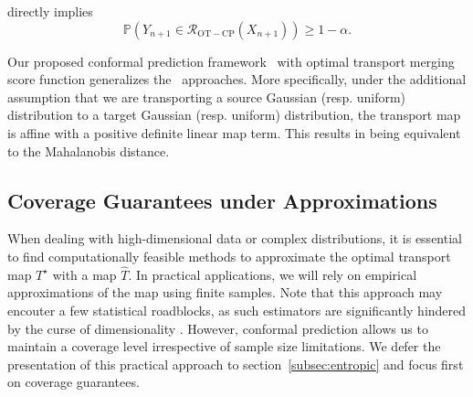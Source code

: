  directly implies
$$
\mathbb{P}(Y_{n+1} \in \mathcal{R}_{\mathrm{OT-CP}}(X_{n+1})) \geq 1-\alpha.
$$

\begin{remark}
Our proposed conformal prediction framework \OTCP\, with optimal transport merging score function generalizes the \MergeCP\, approaches. More specifically, under the additional assumption that we are transporting a source Gaussian (resp. uniform) distribution to a target Gaussian (resp. uniform) distribution, the transport map is affine \cite{gelbrich1990formula, muzellec2018generalizing} with a positive definite linear map term. This results in  being equivalent to the Mahalanobis distance.
\end{remark}





\subsection{Coverage Guarantees under Approximations}\label{sec:coverage}

When dealing with high-dimensional data or complex distributions, it is essential to find computationally feasible methods to approximate the optimal transport map $T^\star$ with a map $\hat{T}$. In practical applications, we will rely on empirical approximations of the \citet{Bre91} map using finite samples. Note that this approach may encouter a few statistical roadblocks, as such estimators are significantly hindered by the curse of dimensionality \citep{chewi2024statistical}.
However, conformal prediction allows us to maintain a coverage level irrespective of sample size limitations. We defer the presentation of this practical approach to section~\ref{subsec:entropic} and focus first on coverage guarantees.

